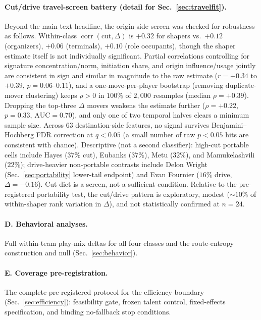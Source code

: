 \documentclass[11pt]{article}
\begin{document}
\paragraph*{Cut/drive travel-screen battery (detail for Sec.~\ref{sec:travelfit}).}
Beyond the main-text headline, the origin-side screen was checked for robustness as follows.
Within-class $\operatorname{corr}(\text{cut},\Delta)$ is $+0.32$ for shapers vs.\ $+0.12$
(organizers), $+0.06$ (terminals), $+0.10$ (role occupants), though the shaper estimate
itself is not individually significant. Partial correlations controlling for signature
concentration/norm, initiation share, and origin influence/usage jointly are consistent in
sign and similar in magnitude to the raw estimate ($r=+0.34$ to $+0.39$, $p=0.06$--$0.11$),
and a one-move-per-player bootstrap (removing duplicate-mover clustering) keeps $\rho>0$ in
$100\%$ of $2{,}000$ resamples (median $\rho=+0.39$). Dropping the top-three $\Delta$ movers
weakens the estimate further ($\rho=+0.22$, $p=0.33$, $\text{AUC}=0.70$), and only one of two
temporal halves clears a minimum sample size. Across $63$ destination-side features, no
signal survives Benjamini--Hochberg FDR correction at $q<0.05$ (a small number of raw
$p<0.05$ hits are consistent with chance). Descriptive (not a second classifier): high-cut
portable cells include Hayes ($37\%$ cut), Eubanks ($37\%$), Metu ($32\%$), and
Mamukelashvili ($22\%$); drive-heavier non-portable contrasts include Delon Wright
(Sec.~\ref{sec:portability} lower-tail endpoint) and Evan Fournier ($16\%$ drive,
$\Delta=-0.16$). Cut diet is a screen, not a sufficient condition. Relative to the
pre-registered portability test, the cut/drive pattern is exploratory, modest
($\sim\!10\%$ of within-shaper rank variation in $\Delta$), and not statistically confirmed
at $n=24$.

\paragraph{D. Behavioral analyses.} Full within-team play-mix deltas for all four classes and
the route-entropy construction and null (Sec.~\ref{sec:behavior}).

\paragraph{E. Coverage pre-registration.} The complete pre-registered protocol for the
efficiency boundary (Sec.~\ref{sec:efficiency}): feasibility gate, frozen talent control,
fixed-effects specification, and binding no-fallback stop conditions.
\end{document}
